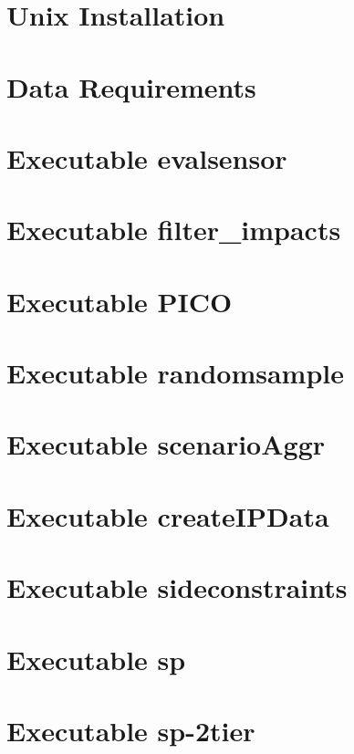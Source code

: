 \chapter{Unix Installation}\label{unixInstall} 

\chapter{Data Requirements}\label{dataRequire} 
 
\chapter{Executable evalsensor}\label{evalsensorExecutable}

\newpage
\chapter{Executable filter\_impacts}\label{filter_impactsExecutable}

\newpage
\chapter{Executable PICO}\label{picoExecutable}

\newpage
\chapter{Executable randomsample}\label{randomsampleExecutable}

\newpage
\chapter{Executable scenarioAggr}\label{scenarioAggrExecutable}

\newpage
\chapter{Executable createIPData}\label{createIPDataExecutable}

\newpage
\chapter{Executable sideconstraints}\label{sideconstraintsExecutable}

\newpage
\chapter{Executable sp}\label{spExecutable}

\newpage 
\chapter{Executable sp-2tier}\label{sp2tierExecutable}
 
\newpage 
